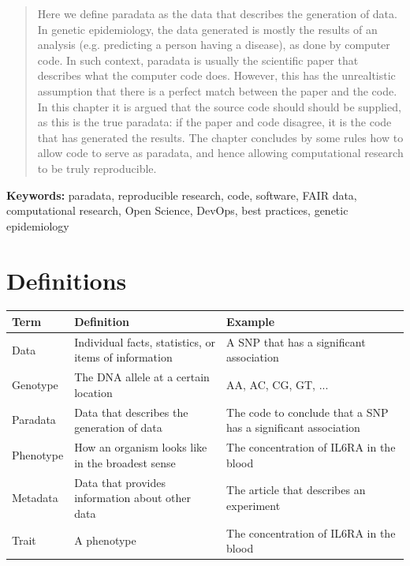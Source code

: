 \begin{abstract}

Here we define paradata as the data that describes the generation of data.
In genetic epidemiology, the data generated is mostly the results 
of an analysis (e.g. predicting a person having a disease),
as done by computer code.
In such context, paradata is usually the scientific paper that
describes what the computer code does.
However, this has the unrealtistic 
assumption that there is a perfect match between the paper and the code.
In this chapter it is argued that the source code should should be supplied,
as this is the true paradata: if the paper and code disagree, it is the
code that has generated the results.
The chapter concludes by some rules how to allow code to serve as paradata,
and hence allowing computational research to be truly reproducible.

\end{abstract}

{\bf Keywords:} paradata, reproducible research, code, software,
FAIR data, computational research, Open Science, DevOps, best practices,
genetic epidemiology

\section*{Definitions}

\begin{table}[h]
  \begin{tabular}{lll}
    Term      & Definition                                            & Example                                                         \\
    \hline
    Data      & Individual facts, statistics, or items of information & A SNP that has a significant association                        \\
    Genotype  & The DNA allele at a certain location                  & AA, AC, CG, GT, ...                                             \\
    Paradata  & Data that describes the generation of data            & The code to conclude that a SNP has a significant association   \\
    Phenotype & How an organism looks like in the broadest sense      & The concentration of IL6RA in the blood                         \\
    Metadata  & Data that provides information about other data       & The article that describes an experiment                        \\
    Trait     & A phenotype                                           & The concentration of IL6RA in the blood                         
  \end{tabular}
\end{table}

